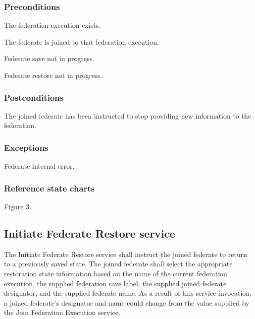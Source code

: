 \subsubsection{Preconditions}

\begin{stdalphalist}
    \item The federation execution exists.
    \item The federate is joined to that federation execution.
    \item Federate save not in progress.
    \item Federate restore not in progress.
\end{stdalphalist}

\subsubsection{Postconditions}

\begin{stdalphalist}
    \item The joined federate has been instructed to stop providing new information to the federation.
\end{stdalphalist}

\subsubsection{Exceptions}

\begin{stdalphalist}
    \item Federate internal error.
\end{stdalphalist}

\subsubsection{Reference state charts}

\begin{stdalphalist}
    \item Figure 3.
\end{stdalphalist}

\subsection{Initiate Federate Restore \rtiinitiated{} service}

The Initiate Federate Restore \rtiinitiated{} service shall instruct the joined federate to return to a previously saved state. The joined federate shall select the appropriate restoration state information based on the name of the current federation execution, the supplied federation save label, the supplied joined federate designator, and the supplied federate name. As a result of this service invocation, a joined federate's designator and name could change from the value supplied by the Join Federation Execution service.

